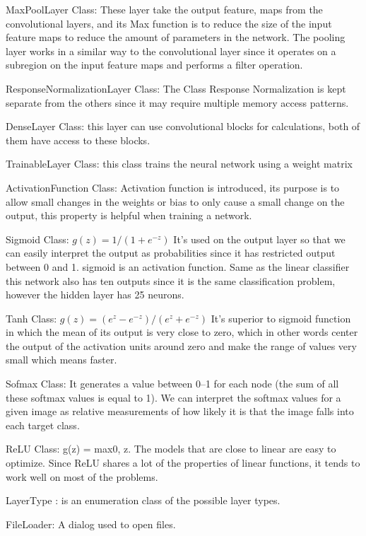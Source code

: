 \documentclass[parskip=full]{scrartcl}
\begin{document}
MaxPoolLayer Class: These layer take the output feature, maps from the convolutional layers, and its Max function is to reduce the size of the input feature maps to reduce the amount of parameters in the network.
The pooling layer works in a similar way to the convolutional layer since it operates on a subregion on the input feature maps and performs a filter operation.

ResponseNormalizationLayer Class: The Class Response Normalization is kept separate from the others since it may require multiple memory access patterns.

DenseLayer Class:  this layer can use convolutional blocks for calculations, both of them have access to these blocks.

TrainableLayer Class: this class trains the neural network using a weight matrix

ActivationFunction Class:  Activation function is introduced, its purpose is to allow small changes in the weights or bias to only cause a small change on the output, this property is helpful when training a network.

Sigmoid Class:  $g(z) = 1 / (1 + e^{-z})$ It’s used on the output layer so that we can easily interpret the output as probabilities since it has restricted output between 0 and 1.
sigmoid is an activation function.  Same as the linear classifier this network also has ten outputs since it is the same classification problem, however the hidden layer has 25 neurons.

Tanh Class: $g(z) = (e^z -e^{-z}) / (e^z + e^{-z})$ It’s superior to sigmoid function in which the mean of its output is very close to zero, which in other words center the output of the activation units around zero and make the range of values very small which means faster.

Sofmax Class: It generates a value between 0–1 for each node (the sum of all these softmax values is equal to 1). We can interpret the softmax values for a given image as relative measurements of how likely it is that the image falls into each target class.

ReLU Class:  g(z) = max{0, z}. The models that are close to linear are easy to optimize. Since ReLU shares a lot of the properties of linear functions, it tends to work well on most of the problems.

LayerType : is an enumeration class of the possible layer types.




FileLoader: A dialog used to open files.
\end{document}
